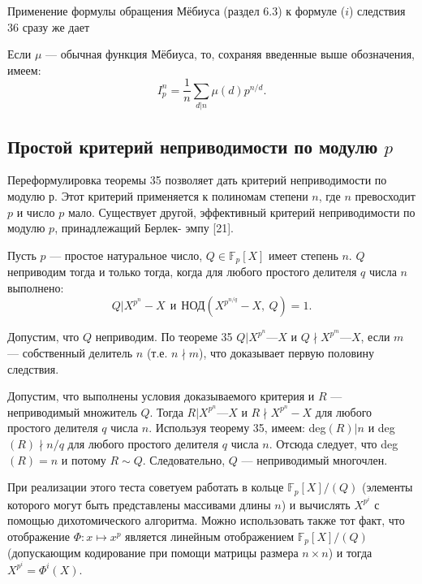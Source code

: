 Применение формулы обращения Мёбиуса (раздел 6.3) к формуле 
($i$) следствия 36 сразу же дает 

\begin{sled}
\hspace*{15pt}Если $\mu$ — обычная функция Мёбиуса, то, сохраняя введенные выше 
обозначения, имеем: 
\begin{equation*}
I^n_p = \frac{1}{n}\sum_{d|n}\mu(d)p^{n \slash d}.
\end{equation*}
\end{sled}
\pagebreak

\subsection{Простой критерий неприводимости по модулю $p$}
Переформулировка теоремы 35 позволяет дать критерий  
неприводимости по модулю $р$. Этот критерий применяется к полиномам степени 
$n$, где $n$ превосходит $p$ и число $p$ мало. Существует другой,  
эффективный критерий неприводимости по модулю $p$, принадлежащий Берлек- 
эмпу [21]. \newline\newline
\begin{sled}
\hspace*{15pt}Пусть $p$ — простое натуральное число, $Q \in \mathbb{F}_p [X]$ имеет степень $n$. $Q$ 
неприводим тогда и только тогда, когда для любого простого делителя 
$q$ числа $n$ выполнено: 
\begin{equation*}
Q|X^{p^n} - X\:\: \textit{и} \:\: \text{НОД}(X^{p^{n\slash q}} - X,\:Q)=1.
\end{equation*}
\end{sled}

\begin{myproof}
Допустим, что $Q$ неприводим. По теореме 35 $Q | X^{p^n} — X$ и 
$Q \nmid X^{p^m} — X$, если $m$ — собственный делитель $n$ (т.е. $n \nmid m$), что 
доказывает первую половину следствия.
 
\noindent Допустим, что выполнены условия доказываемого критерия и $R$ — 
неприводимый множитель $Q$. Тогда $R | X^{p^n} — X$ и $R \nmid X^{p^n} - X$ для 
любого простого делителя $q$ числа $n$. Используя теорему 35, имеем: 
deg$(R) | n$ и deg$(R) \nmid n \slash q$ для любого простого делителя $q$ числа $n$. 
Отсюда следует, что deg$(R) = n$ и потому $R \sim Q$. Следовательно, 
$Q$ — неприводимый многочлен.
\end{myproof}

\begin{mynotice}
При реализации этого теста советуем работать в 
кольце $\mathbb{F}_p[X]\slash(Q)$ (элементы которого могут быть представлены 
массивами длины $n$) и вычислять $X^{p^i}$ с помощью  
дихотомического алгоритма. Можно использовать также тот факт, что  
отображение $ \Phi: x \mapsto x^p$ является линейным отображением $\mathbb{F}_p[X]\slash(Q)$ 
(допускающим кодирование при помощи матрицы размера $n \times n$) 
и тогда $X^{p^i} = \Phi^i(X)$.\newline 
\end{mynotice}

